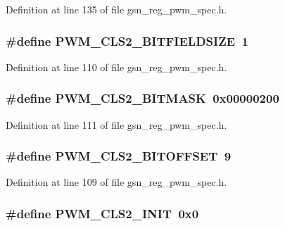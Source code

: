 Definition at line 135 of file gsn\_\-reg\_\-pwm\_\-spec.h.

\hypertarget{a00565_aca1f4663b80ef5947b379df09e3b3433}{
\subsubsection[{PWM\_\-CLS2\_\-BITFIELDSIZE}]{\setlength{\rightskip}{0pt plus 5cm}\#define PWM\_\-CLS2\_\-BITFIELDSIZE~1}}
\label{a00565_aca1f4663b80ef5947b379df09e3b3433}


Definition at line 110 of file gsn\_\-reg\_\-pwm\_\-spec.h.

\hypertarget{a00565_ae3cf31d7a0097a1a0b0847a862df0376}{
\subsubsection[{PWM\_\-CLS2\_\-BITMASK}]{\setlength{\rightskip}{0pt plus 5cm}\#define PWM\_\-CLS2\_\-BITMASK~0x00000200}}
\label{a00565_ae3cf31d7a0097a1a0b0847a862df0376}


Definition at line 111 of file gsn\_\-reg\_\-pwm\_\-spec.h.

\hypertarget{a00565_ae94efecdd4ec42d1aadc52684c9f2bf2}{
\subsubsection[{PWM\_\-CLS2\_\-BITOFFSET}]{\setlength{\rightskip}{0pt plus 5cm}\#define PWM\_\-CLS2\_\-BITOFFSET~9}}
\label{a00565_ae94efecdd4ec42d1aadc52684c9f2bf2}


Definition at line 109 of file gsn\_\-reg\_\-pwm\_\-spec.h.

\hypertarget{a00565_a87ea2c3888708644f116c7d264353d85}{
\subsubsection[{PWM\_\-CLS2\_\-INIT}]{\setlength{\rightskip}{0pt plus 5cm}\#define PWM\_\-CLS2\_\-INIT~0x0}}
\label{a00565_a87ea2c3888708644f116c7d264353d85}


